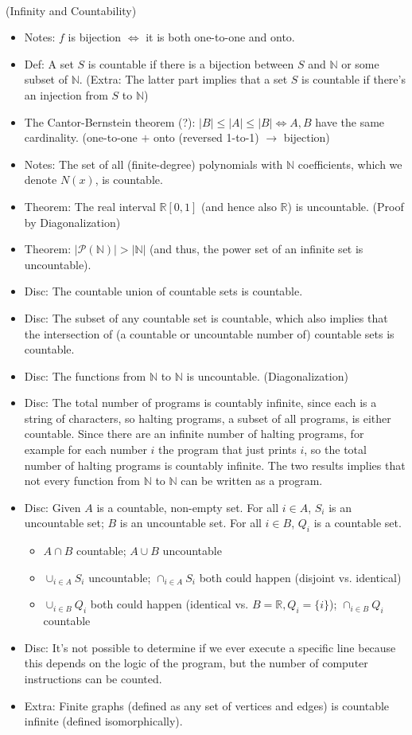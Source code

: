 \documentclass{article}
\begin{document}
 \\
(Infinity and Countability)
\begin{itemize}
	\item Notes: $f$ is bijection $\iff$ it is both one-to-one and onto.
	\item Def: A set $S$ is countable if there is a bijection between $S$ and $\mathbb{N}$ or some subset of $\mathbb{N}$. (Extra: The latter part implies that a set $S$ is countable if there's an injection from $S$ to $\mathbb{N}$)
	\item The Cantor-Bernstein theorem (?): $|B|\leq|A|\leq|B| \iff A,B$ have the same cardinality. (one-to-one $+$ onto (reversed 1-to-1) $\rightarrow$ bijection)
	\item Notes: The set of all (finite-degree) polynomials with $\mathbb{N}$ coefficients, which we denote $N(x)$, is countable.
	\item Theorem: The real interval $\mathbb{R}[0, 1]$ (and hence also $\mathbb{R}$) is uncountable. (Proof by Diagonalization)
	\item Theorem: $|\mathscr{P}(\mathbb{N})| > |\mathbb{N}|$ (and thus, the power set of an infinite set is uncountable).
	\item Disc: The countable union of countable sets is countable.
	\item Disc: The subset of any countable set is countable, which also implies that the intersection of (a countable or uncountable number of) countable sets is countable.
	\item Disc: The functions from $\mathbb{N}$ to $\mathbb{N}$ is uncountable. (Diagonalization)
	\item Disc: The total number of programs is countably infinite, since each is a string of characters, so halting programs, a subset of all programs, is either countable. Since there are an infinite number of halting programs, for example for each number $i$ the program that just prints $i$, so the total number of halting programs is countably infinite. The two results implies that not every function from $\mathbb{N}$ to $\mathbb{N}$ can be written as a program.
	\item Disc: Given $A$ is a countable, non-empty set. For all $i\in A$, $S_i$ is an uncountable set; $B$ is an uncountable set. For all $i\in B$, $Q_i$ is a countable set.
	\begin{itemize}
		\item $A\cap B$ countable; $A\cup B$ uncountable
		\item $\cup_{i\in A} S_i$ uncountable; $\cap_{i\in A} S_i$ both could happen (disjoint vs. identical)
		\item $\cup_{i\in B} Q_i$ both could happen (identical vs. $B=\mathbb{R}, Q_i = \{i\}$); $\cap_{i\in B} Q_i$ countable
	\end{itemize}
	\item Disc: It’s not possible to determine if we ever execute a specific line because this depends on the logic of the program, but the number of computer instructions can be counted.
	\item Extra: Finite graphs (defined as any set of vertices and edges) is countable infinite (defined isomorphically).
\end{itemize}
\end{document}
